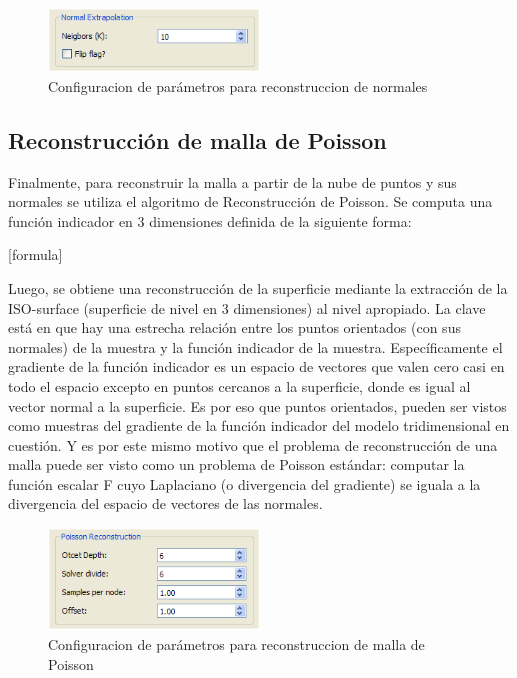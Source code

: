 \begin{figure}[H]
  \centering
    \includegraphics[width=0.5\textwidth]{./Cap6_reconstruccion/malla-normalextrapolation.png}
  \caption{Configuracion de parámetros para reconstruccion de normales}
  \label{fig:Mesh-Normals}
\end{figure}

\subsection{Reconstrucción de malla de Poisson}

Finalmente, para reconstruir la malla a partir de la nube de puntos y sus normales se utiliza el algoritmo de Reconstrucción de Poisson.
Se computa una función indicador  en 3 dimensiones definida de la siguiente forma:


[formula]

Luego, se obtiene una reconstrucción de la superficie mediante la extracción de la ISO-surface (superficie de nivel en 3 dimensiones) al nivel apropiado.
La clave está en que hay una estrecha relación entre los puntos orientados (con sus normales) de la muestra y la función indicador de la muestra. Específicamente el gradiente de la función indicador es un espacio de vectores que valen cero casi en todo el espacio excepto en puntos cercanos a la superficie, donde es igual al vector normal a la superficie.
Es por eso que puntos orientados, pueden ser vistos como muestras del gradiente de la función indicador del modelo tridimensional en cuestión. Y es por este mismo motivo que el problema de reconstrucción de una malla puede ser visto como un problema de Poisson estándar: computar la función escalar F cuyo Laplaciano (o divergencia del gradiente) se iguala a la divergencia del espacio de vectores de las normales.

\begin{figure}[H]
  \centering
    \includegraphics[width=0.5\textwidth]{./Cap6_reconstruccion/malla-poissonreconstruction.png}
  \caption{Configuracion de parámetros para reconstruccion de malla de Poisson}
  \label{fig:Mesh-Normals}
\end{figure}

